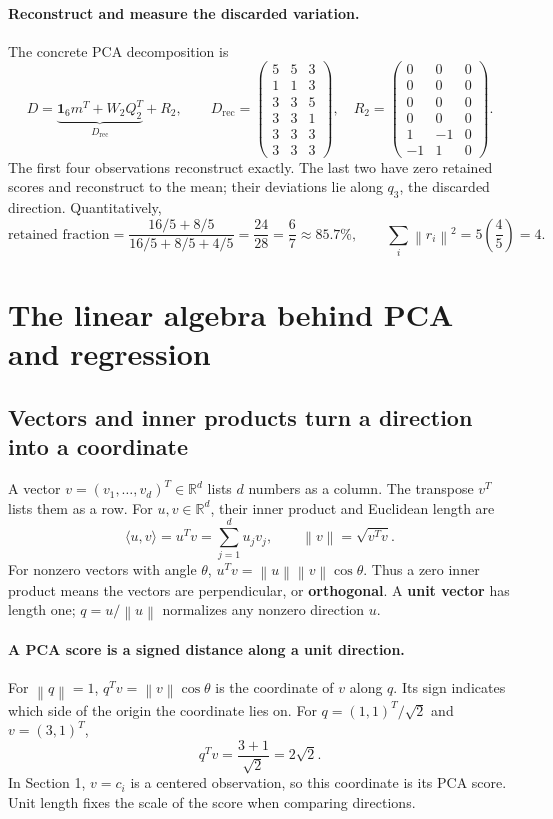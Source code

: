 \documentclass[11pt]{article}
\newcommand{\R}{\mathbb R}
\newcommand{\norm}[1]{\left\lVert#1\right\rVert}
\begin{document}
\paragraph{Reconstruct and measure the discarded variation.}
The concrete PCA decomposition is
\[
 D=\underbrace{\mathbf1_6m^T+W_2Q_2^T}_{D_{\mathrm{rec}}}+R_2,
 \qquad
 D_{\mathrm{rec}}=\begin{pmatrix}
 5&5&3\\1&1&3\\3&3&5\\3&3&1\\3&3&3\\3&3&3
 \end{pmatrix},\quad
 R_2=\begin{pmatrix}
 0&0&0\\0&0&0\\0&0&0\\0&0&0\\1&-1&0\\-1&1&0
 \end{pmatrix}.
\]
The first four observations reconstruct exactly. The last two have zero
retained scores and reconstruct to the mean; their deviations lie along
$q_3$, the discarded direction. Quantitatively,
\[
 \boxed{\text{retained fraction}=\frac{16/5+8/5}{16/5+8/5+4/5}
 =\frac{24}{28}=\frac67\approx85.7\%,\qquad
 \sum_i\norm{r_i}^2=5\left(\frac45\right)=4.}
\]

\newpage
\section{The linear algebra behind PCA and regression}
\subsection{Vectors and inner products turn a direction into a coordinate}
A vector $v=(v_1,\ldots,v_d)^T\in\R^d$ lists $d$ numbers as a column.
The transpose $v^T$ lists them as a row. For $u,v\in\R^d$, their inner
product and Euclidean length are
\[
 \langle u,v\rangle=u^Tv=\sum_{j=1}^d u_jv_j,
 \qquad \norm{v}=\sqrt{v^Tv}.
\]
For nonzero vectors with angle $\theta$,
$u^Tv=\norm{u}\norm{v}\cos\theta$.
Thus a zero inner product means the vectors are perpendicular, or
\textbf{orthogonal}. A \textbf{unit vector} has length one;
$q=u/\norm{u}$ normalizes any nonzero direction $u$.

\paragraph{A PCA score is a signed distance along a unit direction.}
For $\norm{q}=1$, $q^Tv=\norm{v}\cos\theta$ is the coordinate of $v$
along $q$. Its sign indicates which side of the origin the coordinate lies on.
For $q=(1,1)^T/\sqrt2$ and $v=(3,1)^T$,
\[
 q^Tv=\frac{3+1}{\sqrt2}=2\sqrt2.
\]
In Section 1, $v=c_i$ is a centered observation, so this coordinate is
its PCA score. Unit length fixes the scale of the score when comparing directions.
\end{document}
